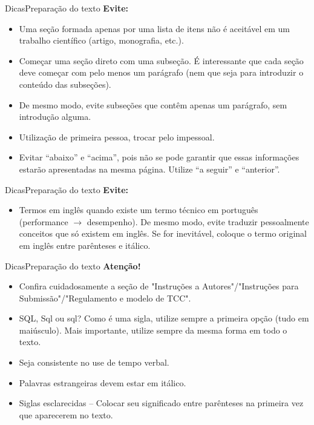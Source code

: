 \documentclass[t]{beamer}
\begin{document}

\begin{ftst}{Dicas}{Preparação do texto}
\justifying
\textbf{Evite:}
\vone

\begin{itemize}
    \item Uma seção formada apenas por uma lista de itens não é aceitável em um trabalho científico (artigo, monografia, etc.).
    \item Começar uma seção direto com uma subseção. É interessante que cada seção deve começar com pelo menos um parágrafo (nem que seja para introduzir o conteúdo das subseções).
    \item De mesmo modo, evite subseções que contêm apenas um parágrafo, sem introdução alguma. 
    \item Utilização de primeira pessoa, trocar pelo impessoal.
    \item Evitar “abaixo” e “acima”, pois não se pode garantir que essas informações estarão apresentadas na mesma página. Utilize “a seguir” e “anterior”.
\end{itemize}

\end{ftst}


\begin{ftst}{Dicas}{Preparação do texto}
\justifying
\textbf{Evite:}
\vone
\begin{itemize}
    \item Termos em inglês quando existe um termo técnico em português (performance $\rightarrow$ desempenho). De mesmo modo, evite traduzir pessoalmente conceitos que só existem em inglês. Se for inevitável, coloque o termo original em inglês entre parênteses e itálico.
\end{itemize}

\end{ftst}


\begin{ftst}{Dicas}{Preparação do texto}
\justifying
\textbf{Atenção!}
\vone

\begin{itemize}
    \item Confira cuidadosamente a seção de "Instruções a Autores"/"Instruções para Submissão"/"Regulamento e modelo de TCC".
    \item SQL, Sql ou sql? Como é uma sigla, utilize sempre a primeira opção (tudo em maiúsculo). Mais importante, utilize sempre da mesma forma em todo o texto.
    \item Seja consistente no use de tempo verbal.
    \item Palavras estrangeiras devem estar em itálico.
    \item Siglas esclarecidas – Colocar seu significado entre parênteses na primeira vez que aparecerem no texto.
\end{itemize}

\end{ftst}
\end{document}
